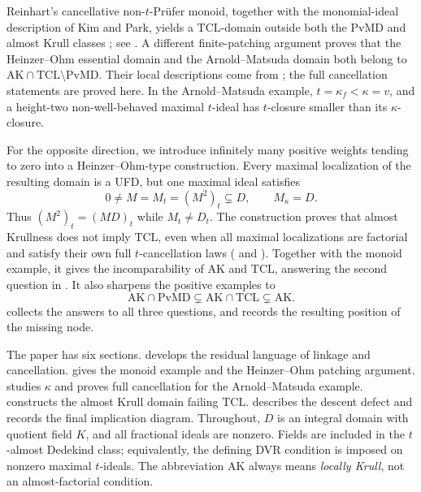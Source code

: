 \documentclass[11pt]{amsart}
\theoremstyle{definition}
\theoremstyle{remark}
\newcommand{\PvMD}{\mathrm{PvMD}}
\newcommand{\TCL}{\mathrm{TCL}}
\newcommand{\AK}{\mathrm{AK}}
\begin{document}
Reinhart's cancellative non-$t$-Pr\"ufer monoid, together with the
monomial-ideal description of Kim and Park, yields a $\TCL$-domain
outside both the $\PvMD$ and almost Krull classes
\cite{KimPark, Reinhart}; see .  A different
finite-patching argument proves that the Heinzer--Ohm essential domain
and the Arnold--Matsuda domain both belong to
$\AK\cap\TCL\setminus\PvMD$.  Their local descriptions come from
\cite{ArnoldMatsuda, HeinzerOhm, HoustonKabbajMimouni}; the full cancellation
statements are proved here.  In the Arnold--Matsuda example,
$t=\kappa_f<\kappa=v$, and a height-two non-well-behaved maximal $t$-ideal
has $t$-closure smaller than its $\kappa$-closure.

For the opposite direction, we introduce infinitely many positive weights
tending to zero into a Heinzer--Ohm-type construction.  Every maximal
localization of the resulting domain is a UFD, but one maximal ideal
satisfies
\begin{equation}\label{eq:intro-counterexample}
 0\ne M=M_t=(M^2)_t\subsetneq D,\qquad M_\kappa=D.
\end{equation}
Thus $(M^2)_t=(MD)_t$ while $M_t\ne D_t$.  The construction proves that
almost Krullness does not imply $\TCL$, even when all maximal
localizations are factorial and satisfy their own full $t$-cancellation
laws ( and ).  Together with the monoid
example, it gives the incomparability of $\AK$ and $\TCL$, answering the
second question in .  It also sharpens the positive examples to
\begin{equation}\label{eq:intro-intersections}
 \AK\cap\PvMD\subsetneq\AK\cap\TCL\subsetneq\AK.
\end{equation}
 collects the answers to all three questions, and
 records the resulting position of the missing node.

The paper has six sections.   develops the residual
language of linkage and cancellation.   gives the monoid
example and the Heinzer--Ohm patching argument.   studies
$\kappa$ and proves full cancellation for the Arnold--Matsuda example.
 constructs the almost Krull domain failing
$\TCL$.   describes the descent defect and records the
final implication diagram.  Throughout, $D$ is an integral domain with
quotient field $K$, and all fractional ideals are nonzero.  Fields are
included in the $t$-almost Dedekind class; equivalently, the defining DVR
condition is imposed on nonzero maximal $t$-ideals.  The abbreviation
$\AK$ always means \emph{locally Krull}, not an almost-factorial condition.
\end{document}

